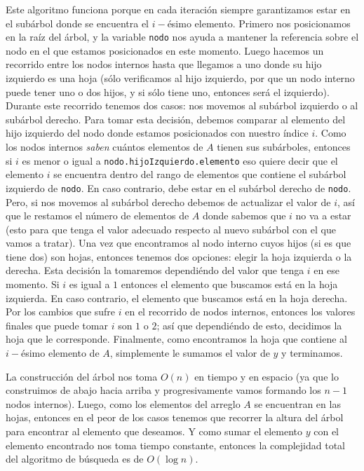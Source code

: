 \documentclass[letterpaper,11pt]{article}
\begin{document}
\begin{enumerate}
\begin{itemize}
        Este algoritmo funciona porque en cada iteración siempre garantizamos 
        estar en el subárbol donde se encuentra el $i-$ésimo elemento. Primero 
        nos posicionamos en la raíz del árbol, y la variable \texttt{nodo} nos 
        ayuda a mantener la referencia sobre el nodo en el que estamos 
        posicionados en este momento. Luego hacemos un recorrido entre los
        nodos internos hasta que llegamos a uno donde su hijo izquierdo es 
        una hoja (sólo verificamos al hijo izquierdo, por que un nodo interno 
        puede tener uno o dos hijos, y si sólo tiene uno, entonces será el 
        izquierdo). Durante este recorrido tenemos dos casos: nos movemos al 
        subárbol izquierdo o al subárbol derecho. Para tomar esta decisión, 
        debemos comparar al elemento del hijo izquierdo del nodo donde estamos 
        posicionados con nuestro índice $i$. Como los nodos internos 
        \textit{saben} cuántos elementos de $A$ tienen sus subárboles, 
        entonces si $i$ es menor o igual a \texttt{nodo.hijoIzquierdo.elemento}
        eso quiere decir que el elemento $i$ se encuentra dentro del rango 
        de elementos que contiene el subárbol izquierdo de \texttt{nodo}. En 
        caso contrario, debe estar en el subárbol derecho de \texttt{nodo}. 
        Pero, si nos movemos al subárbol derecho debemos de actualizar el 
        valor de $i$, así que le restamos el número de elementos de $A$ donde 
        sabemos que $i$ no va a estar (esto para que tenga el valor adecuado 
        respecto al nuevo subárbol con el que vamos a tratar). Una vez que 
        encontramos al nodo interno cuyos hijos (si es que tiene dos) son 
        hojas, entonces tenemos dos opciones: elegir la hoja izquierda o la 
        derecha. Esta decisión la tomaremos dependiéndo del valor que tenga 
        $i$ en ese momento. Si $i$ es igual a $1$ entonces el elemento que 
        buscamos está en la hoja izquierda. En caso contrario, el elemento que 
        buscamos está en la hoja derecha. Por los cambios que sufre $i$ en el 
        recorrido de nodos internos, entonces los valores finales que puede 
        tomar $i$ son $1$ o $2$; así que dependiéndo de esto, decidimos la 
        hoja que le corresponde. Finalmente, como encontramos la hoja que
        contiene al $i-$ésimo elemento de $A$, simplemente le sumamos el 
        valor de $y$ y terminamos. 

        La construcción del árbol nos toma $O(n)$ en tiempo y en espacio (ya 
        que lo construimos de abajo hacia arriba y progresivamente vamos 
        formando los $n-1$ nodos internos). Luego, como los elementos del 
        arreglo $A$ se encuentran en las hojas, entonces en el peor de los 
        casos tenemos que recorrer la altura del árbol para encontrar al 
        elemento que deseamos. Y como sumar el elemento $y$ con el elemento 
        encontrado nos toma tiempo constante, entonces la complejidad total 
        del algoritmo de búsqueda es de $O(\log n)$.


\end{itemize}
\end{enumerate}
\end{document}

